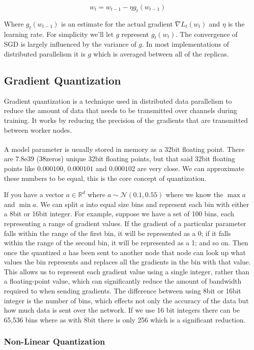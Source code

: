 \documentclass[twocolumn,10pt]{article}
\begin{document}
$$
w_{t} = w_{t-1} - \eta g_t(w_{t-1})
$$

Where $g_t(w_{t-1})$ is an estimate for the actual gradient ${\nabla} L_t(w_t)$ and $\eta$ is the learning rate. For simplicity we'll let $g$ represent $g_t(w_t)$. The convergence of SGD is largely influenced by the variance of $g$. In most implementations of distributed parallelism it is $g$ which is averaged between all of the replicas.


\subsection{Gradient Quantization}
Gradient quantization is a technique used in distributed data parallelism to reduce the amount of data that needs to be transmitted over channels during training. It works by reducing the precision of the gradients that are transmitted between worker nodes.
\\\\
A model parameter is usually stored in memory as a 32bit floating point. There are $7.8\text{e}39$ (38zeros) unique 32bit floating points, but that said 32bit floating points like $0.000100$, $0.000101$ and $0.000102$ are very close. We can approximate these numbers to be equal, this is the core concept of quantization.

If you have a vector $a \in \mathbb{R}^d$ where $a \sim \mathcal{N}(0.1,0.55)$ where we know the $\max a$ and $\min a$. We can split $a$ into equal size bins and represent each bin with either a 8bit or 16bit integer. For example, suppose we have a set of 100 bins, each representing a range of gradient values. If the gradient of a particular parameter falls within the range of the first bin, it will be represented as a 0; if it falls within the range of the second bin, it will be represented as a 1; and so on. Then once the quantized $a$ has been sent to another node that node can look up what values the bin represents and replaces all the gradients in the bin with that value. This allows us to represent each gradient value using a single integer, rather than a floating-point value, which can significantly reduce the amount of bandwidth required to when sending gradients. The difference between using 8bit or 16bit integer is the number of bins, which effects not only the accuracy of the data but how much data is sent over the network. If we use 16 bit integers there can be 65,536 bins where as with 8bit there is only 256 which is a significant reduction.

\subsubsection{Non-Linear Quantization}
\end{document}
